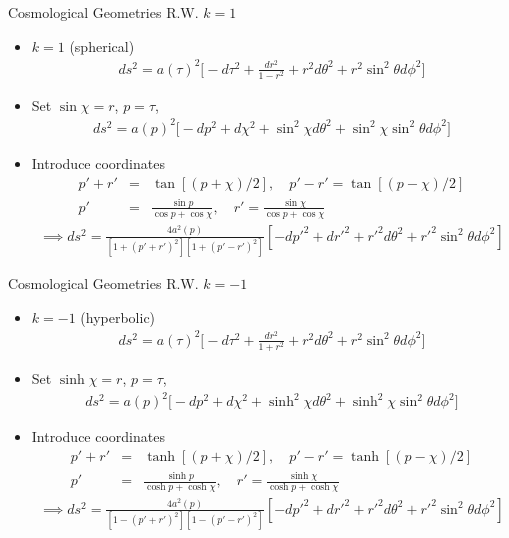 \documentclass[8pt,aspectratio=1610]{beamer}
\begin{document}
\begin{frame}{Cosmological Geometries R.W. $k=1$}
	\begin{itemize}
		\item $k=1$ (spherical)
		\begin{eqnarray}
		ds^2 = a(\tau)^2\bigg[-d\tau^2 + \frac{dr^2}{1-r^2} + r^2 d\theta^2 + r^2 \sin^2\theta d\phi^2\bigg]
		\end{eqnarray}
		\item Set $\sin\chi = r$, $p = \tau$,
		\begin{eqnarray}
		ds^2 = a(p)^2\bigg[-dp^2 + d\chi^2 + \sin^2\chi d\theta^2 + \sin^2\chi \sin^2\theta d\phi^2\bigg]
		\end{eqnarray}
		\item Introduce coordinates
		\begin{eqnarray}
		p' + r' &=& \tan[(p+\chi)/2],\quad p'-r'=\tan[(p-\chi)/2]
		\nonumber\\
		p' &=& \frac{\sin p}{\cos p + \cos \chi}, \quad r' = \frac{\sin\chi}{\cos p + \cos\chi}
		\end{eqnarray}
		\begin{eqnarray}
		\implies \boxed{ds^2 = \frac{4a^2(p)}{[1+(p'+r')^2][1+(p'-r')^2]}[-dp'^2 + dr'^2 +r'^2 d\theta^2 + r'^2\sin^2\theta d\phi^2]}
		\end{eqnarray}
	\end{itemize}
\end{frame}


\begin{frame}{Cosmological Geometries R.W. $k=-1$}
	\begin{itemize}
		\item $k=-1$ (hyperbolic) \textcolor{white}{\cite{phelps_2019}}\textcolor{white}{\cite{amarasinghe_2019}}
		\begin{eqnarray}
		ds^2 = a(\tau)^2\bigg[-d\tau^2 + \frac{dr^2}{1+r^2}  + r^2 d\theta^2 + r^2 \sin^2\theta d\phi^2\bigg]
		\end{eqnarray}
		\item Set $\sinh\chi = r$, $p = \tau$,
		\begin{eqnarray}
		ds^2 = a(p)^2\bigg[-dp^2 + d\chi^2 + \sinh^2\chi d\theta^2 + \sinh^2\chi \sin^2\theta d\phi^2\bigg]
		\end{eqnarray} 
		\item Introduce coordinates
		\begin{eqnarray}
		p' + r' &=& \tanh[(p+\chi)/2],\quad p'-r'=\tanh[(p-\chi)/2]
		\nonumber\\
		p' &=& \frac{\sinh p}{\cosh p + \cosh \chi}, \quad r' = \frac{\sinh\chi}{\cosh p + \cosh\chi}
		\end{eqnarray}
		\begin{eqnarray}
		\implies \boxed{ds^2 = \frac{4a^2(p)}{[1-(p'+r')^2][1-(p'-r')^2]}[-dp'^2 + dr'^2 +r'^2 d\theta^2 + r'^2\sin^2\theta d\phi^2]}
		\end{eqnarray}
	\end{itemize}
\end{frame}
\end{document}
